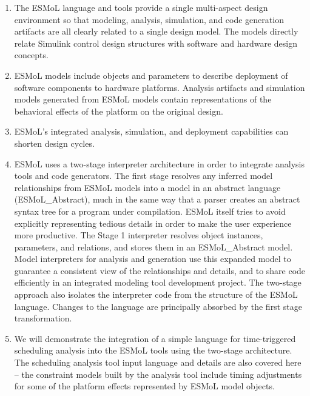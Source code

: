 \begin{enumerate}
 \item The ESMoL language and tools provide a single multi-aspect design environment so that modeling, analysis, 
simulation, and code generation artifacts are all clearly related to a single design model.  The models directly relate Simulink control design structures with
software and hardware design concepts.
 \item ESMoL models include objects and parameters to describe deployment of software components to 
hardware platforms.  Analysis artifacts and simulation models generated from ESMoL models contain 
representations of the behavioral effects of the platform on the original design.
 \item ESMoL's integrated analysis, simulation, and deployment capabilities can shorten design cycles.
 \item ESMoL uses a two-stage interpreter architecture in order to integrate analysis tools and code
generators.  The first stage resolves any inferred model relationships from ESMoL models into a model in 
an abstract language (ESMoL\_Abstract), much in the same way that a parser creates an abstract syntax tree 
for a program under compilation.  ESMoL itself tries to avoid explicitly representing tedious details in order to make the user 
experience more productive.  The Stage 1 interpreter resolves object instances, parameters, and 
relations, and stores them in an ESMoL\_Abstract model.  Model interpreters for analysis and generation
use this expanded model to guarantee a consistent view of the relationships and details, and to share
code efficiently in an integrated modeling tool development project.  The two-stage approach also 
isolates the interpreter code from the structure of the ESMoL language.  Changes to the language are 
principally absorbed by the first stage transformation.
 \item We will demonstrate the integration of a simple language for time-triggered scheduling analysis 
into the ESMoL tools using the two-stage architecture.  The scheduling analysis tool input language and
details are also covered here -- the constraint models built by the analysis tool include timing
adjustments for some of the platform effects represented by ESMoL model objects.
\end{enumerate}



